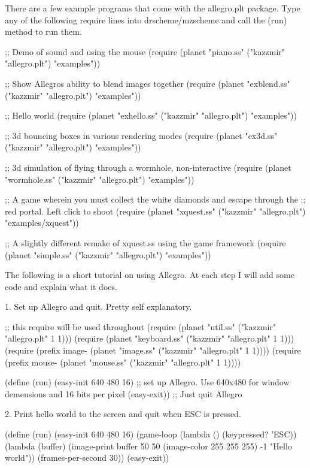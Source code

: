 There are a few example programs that come with the allegro.plt package. Type any of the following require lines into drscheme/mzscheme and call the (run) method to run them.

\begin{schemedisplay}
;; Demo of sound and using the mouse
(require (planet "piano.ss" ("kazzmir" "allegro.plt") "examples"))

;; Show Allegros ability to blend images together
(require (planet "exblend.ss" ("kazzmir" "allegro.plt") "examples"))

;; Hello world
(require (planet "exhello.ss" ("kazzmir" "allegro.plt") "examples"))

;; 3d bouncing boxes in various rendering modes
(require (planet "ex3d.ss" ("kazzmir" "allegro.plt") "examples"))

;; 3d simulation of flying through a wormhole, non-interactive 
(require (planet "wormhole.ss" ("kazzmir" "allegro.plt") "examples"))

;; A game wherein you must collect the white diamonds and escape through the
;; red portal. Left click to shoot
(require (planet "xquest.ss" ("kazzmir" "allegro.plt") "examples/xquest"))

;; A slightly different remake of xquest.ss using the game framework
(require (planet "simple.ss" ("kazzmir" "allegro.plt") "examples"))
\end{schemedisplay}

The following is a short tutorial on using Allegro. At each step I will add
some code and explain what it does.

1. Set up Allegro and quit. Pretty self explanatory.

\begin{schemedisplay}
;; this require will be used throughout
(require (planet "util.ss" ("kazzmir" "allegro.plt" 1 1)))
(require (planet "keyboard.ss" ("kazzmir" "allegro.plt" 1 1)))
(require (prefix image- (planet "image.ss" ("kazzmir" "allegro.plt" 1 1))))
(require (prefix mouse- (planet "mouse.ss" ("kazzmir" "allegro.plt" 1 1))))

(define (run)
  (easy-init 640 480 16) ;; set up Allegro. Use 640x480 for window demensions and 16 bits per pixel
  (easy-exit)) ;; Just quit Allegro
\end{schemedisplay}

2. Print hello world to the screen and quit when ESC is pressed.

\begin{schemedisplay}
(define (run)
  (easy-init 640 480 16)
  (game-loop
     (lambda ()
        (keypressed? 'ESC))
     (lambda (buffer)
        (image-print buffer 50 50 (image-color 255 255 255) -1 "Hello world"))
     (frames-per-second 30))
  (easy-exit))
\end{schemedisplay}

